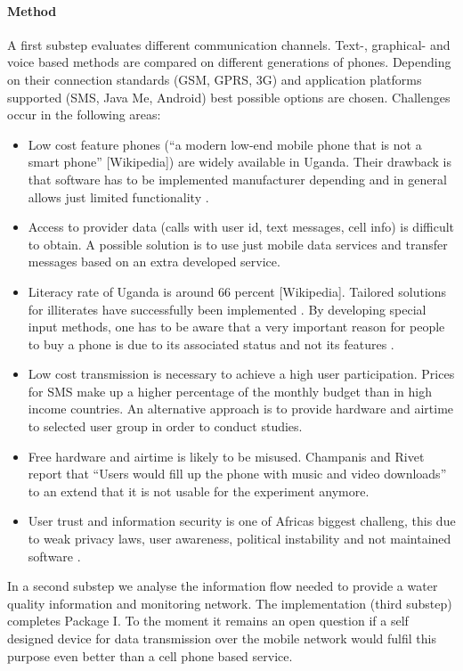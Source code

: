 \documentclass[11pt]{article}
\begin{document}
\paragraph{Method} A first substep evaluates different communication channels. Text-, graphical- and voice based methods are compared on different generations of phones. Depending on their connection standards (GSM, GPRS, 3G) and application platforms supported (SMS, Java Me, Android) best possible options are chosen. Challenges occur in the following areas:
\begin{itemize}
 \item Low cost feature phones (``a modern low-end mobile phone that is not a smart phone'' [Wikipedia]) are widely available in Uganda. Their drawback is that software has to be implemented manufacturer depending and in general allows just limited functionality \cite{champanis2012reporting}.
 \item Access to provider data (calls with user id, text messages, cell info) is difficult to obtain. A possible solution is to use just mobile data services and transfer messages based on an extra developed service.
 \item Literacy rate of Uganda is around 66 percent [Wikipedia]. Tailored solutions for illiterates have successfully been implemented \cite{brown2012water}. By developing special input methods, one has to be aware that a very important reason for people to buy a phone is due to its associated status and not its features \cite{knoche2012text}.
 \item Low cost transmission is necessary to achieve a high user participation. Prices for SMS make up a higher percentage of the monthly budget than in high income countries. An alternative approach is to provide hardware and airtime to selected user group in order to conduct studies.
 \item Free hardware and airtime is likely to be misused. Champanis and Rivet report that ``Users would fill up the phone with music and video downloads'' \cite{champanis2012reporting} to an extend that it is not usable for the experiment anymore.
 \item User trust and information security is one of Africas biggest challeng, this due to weak privacy laws, user awareness, political instability and not maintained software \cite{goodman2010coming}.
\end{itemize}

In a second substep we analyse the information flow needed to provide a water quality information and monitoring network. The implementation (third substep) completes Package I. To the moment it remains an open question if a self designed device for data transmission over the mobile network would fulfil this purpose even better than a cell phone based service. 
\end{document}
